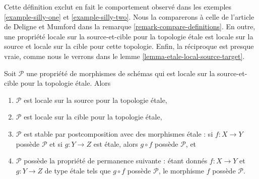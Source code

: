 \noindent
Cette définition exclut en fait le comportement observé dans les
exemples \ref{example-silly-one} et \ref{example-silly-two}.
Nous la comparerons à celle de l'article \cite{DM} de Deligne et Mumford dans
la remarque \ref{remark-compare-definitions}.
En outre, une propriété locale sur la source-et-cible pour la topologie
\'etale est locale sur la source et locale sur la cible pour cette topologie.
Enfin, la réciproque est presque vraie, comme nous le verrons dans le
lemme \ref{lemma-etale-local-source-target}.

\begin{lemma}
\label{lemma-local-source-target-implies}
Soit $\mathcal{P}$ une propriété de morphismes de schémas qui est locale sur
la source-et-cible pour la topologie \'etale. Alors
\begin{enumerate}
\item $\mathcal{P}$ est locale sur la source pour la topologie \'etale,
\item $\mathcal{P}$ est locale sur la cible pour la topologie \'etale,
\item $\mathcal{P}$ est stable par postcomposition avec des morphismes
\'etale : si $f : X \to Y$ possède $\mathcal{P}$ et si $g : Y \to Z$ est
\'etale, alors $g \circ f$ possède $\mathcal{P}$, et
\item $\mathcal{P}$ possède la propriété de permanence suivante : étant donnés
$f : X \to Y$ et $g : Y \to Z$ de type \'etale tels que $g \circ f$ possède
$\mathcal{P}$, le morphisme $f$ possède $\mathcal{P}$.
\end{enumerate}
\end{lemma}

